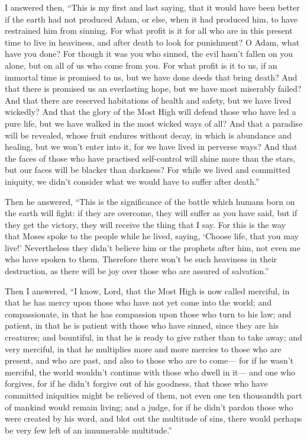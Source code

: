  I answered then, ``This is my first and last saying, that
it would have been better if the earth had not produced Adam, or else,
when it had produced him, to have restrained him from sinning.
 For what profit is it for all who are in this present
time to live in heaviness, and after death to look for punishment?
 O Adam, what have you done? For though it was you who
sinned, the evil hasn't fallen on you alone, but on all of us who come
from you.  For what profit is it to us, if an immortal
time is promised to us, but we have done deeds that bring death?
 And that there is promised us an everlasting hope, but we
have most miserably failed?  And that there are reserved
habitations of health and safety, but we have lived wickedly?
 And that the glory of the Most High will defend those who
have led a pure life, but we have walked in the most wicked ways of all?
 And that a paradise will be revealed, whose fruit endures
without decay, in which is abundance and healing, but we won't enter
into it,  for we have lived in perverse ways?
 And that the faces of those who have practised
self-control will shine more than the stars, but our faces will be
blacker than darkness?  For while we lived and committed
iniquity, we didn't consider what we would have to suffer after death.''

 Then he answered, ``This is the significance of the
battle which humans born on the earth will fight:  if they
are overcome, they will suffer as you have said, but if they get the
victory, they will receive the thing that I say.  For this
is the way that Moses spoke to the people while he lived, saying,
`Choose life, that you may live!'  Nevertheless they
didn't believe him or the prophets after him, not even me who have
spoken to them.  Therefore there won't be such heaviness
in their destruction, as there will be joy over those who are assured of
salvation.''

 Then I answered, ``I know, Lord, that the Most High is
now called merciful, in that he has mercy upon those who have not yet
come into the world;  and compassionate, in that he has
compassion upon those who turn to his law;  and patient,
in that he is patient with those who have sinned, since they are his
creatures;  and bountiful, in that he is ready to give
rather than to take away;  and very merciful, in that he
multiplies more and more mercies to those who are present, and who are
past, and also to those who are to come---  for if he
wasn't merciful, the world wouldn't continue with those who dwell in
it---  and one who forgives, for if he didn't forgive out
of his goodness, that those who have committed iniquities might be
relieved of them, not even one ten thousandth part of mankind would
remain living;  and a judge, for if he didn't pardon those
who were created by his word, and blot out the multitude of sins,
 there would perhaps be very few left of an innumerable
multitude.''

